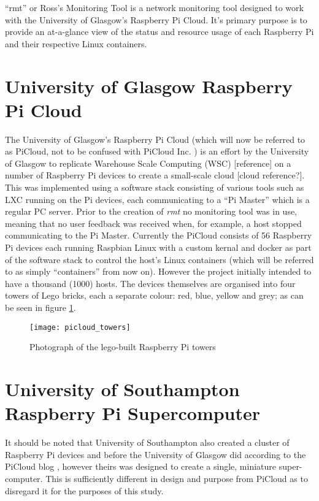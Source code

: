 ``rmt'' or Ross's Monitoring Tool is a network monitoring tool 
designed to work with the University of Glasgow's Raspberry Pi 
Cloud. It's primary purpose is to provide an at-a-glance view of the 
status and resource usage of each Raspberry Pi and their respective 
Linux containers.

\section{University of Glasgow Raspberry Pi Cloud}
\label{intro:picloud}

The University of Glasgow's Raspberry Pi Cloud \citep{glapicloud, picloudblog} (which will now be 
referred to as PiCloud, not to be confused with PiCloud Inc. \citeyearpar{picloudinc}) is an effort by the University of Glasgow to replicate Warehouse Scale Computing (WSC) [reference] on a number of Raspberry Pi \citep{rasppi} devices to create a small-scale cloud [cloud reference?].
This was implemented using a software stack consisting of various tools such as LXC \citeyearpar{lxc}running on the Pi devices, each communicating to a ``Pi Master'' which is a regular PC server.
Prior to the creation of \emph{rmt} no monitoring tool was in use, meaning that no user feedback was received when, for example, a host stopped communicating to the Pi Master.
Currently the PiCloud consists of 56 Raspberry Pi devices each running Raspbian Linux \citeyearpar{raspbian} with a custom kernal and docker \citeyearpar{docker} as part of the software stack to control the host's Linux containers (which will be referred to as simply ``containers'' from now on).
However the project initially intended to have a thousand (1000) hosts.
The devices themselves are organised into four towers of Lego bricks, each a separate colour: red, blue, yellow and grey; as can be seen in figure \ref{fig:pitowers}.

\begin{figure}[t]
	\centering
	\texttt{[image: picloud\_towers]}
	\caption{Photograph of the lego-built Raspberry Pi towers}
	\label{fig:pitowers}
\end{figure}

\section{University of Southampton Raspberry Pi Supercomputer}
\label{intro:pisupercomp}

It should be noted that University of Southampton also created a cluster of Raspberry Pi devices and before the University of Glasgow did according to the PiCloud blog \citep{picloudblog}, however theirs was designed to create a single, miniature super-computer.
This is sufficiently different in design and purpose from PiCloud as to disregard it for the purposes of this study.
